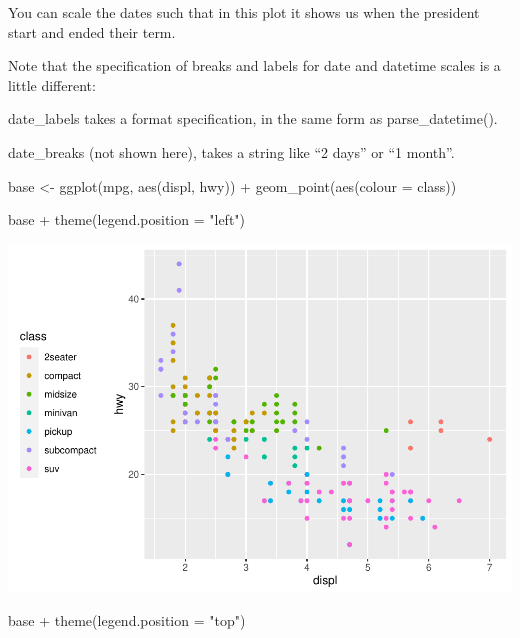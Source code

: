 \documentclass[
]{article}
\newenvironment{Shaded}{\begin{snugshade}}{\end{snugshade}}
\newcommand{\AttributeTok}[1]{\textcolor[rgb]{0.77,0.63,0.00}{#1}}
\newcommand{\FunctionTok}[1]{\textcolor[rgb]{0.00,0.00,0.00}{#1}}
\newcommand{\NormalTok}[1]{#1}
\newcommand{\OtherTok}[1]{\textcolor[rgb]{0.56,0.35,0.01}{#1}}
\newcommand{\SpecialCharTok}[1]{\textcolor[rgb]{0.00,0.00,0.00}{#1}}
\newcommand{\StringTok}[1]{\textcolor[rgb]{0.31,0.60,0.02}{#1}}
\begin{document}
You can scale the dates such that in this plot it shows us when the
president start and ended their term.

Note that the specification of breaks and labels for date and datetime
scales is a little different:

date\_labels takes a format specification, in the same form as
parse\_datetime().

date\_breaks (not shown here), takes a string like ``2 days'' or ``1
month''.

\begin{Shaded}
\begin{Highlighting}[]
\NormalTok{base }\OtherTok{\textless{}{-}} \FunctionTok{ggplot}\NormalTok{(mpg, }\FunctionTok{aes}\NormalTok{(displ, hwy)) }\SpecialCharTok{+}
  \FunctionTok{geom\_point}\NormalTok{(}\FunctionTok{aes}\NormalTok{(}\AttributeTok{colour =}\NormalTok{ class))}

\NormalTok{base }\SpecialCharTok{+} \FunctionTok{theme}\NormalTok{(}\AttributeTok{legend.position =} \StringTok{"left"}\NormalTok{)}
\end{Highlighting}
\end{Shaded}

\includegraphics{Journal_files/figure-latex/unnamed-chunk-56-1.pdf}

\begin{Shaded}
\begin{Highlighting}[]
\NormalTok{base }\SpecialCharTok{+} \FunctionTok{theme}\NormalTok{(}\AttributeTok{legend.position =} \StringTok{"top"}\NormalTok{)}
\end{Highlighting}
\end{Shaded}
\end{document}
